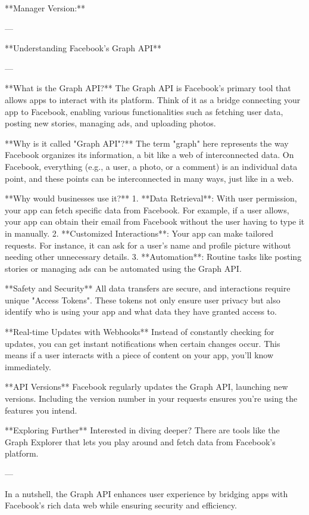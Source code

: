 **Manager Version:**

---

**Understanding Facebook's Graph API**

---

**What is the Graph API?**
The Graph API is Facebook's primary tool that allows apps to interact with its platform. Think of it as a bridge connecting your app to Facebook, enabling various functionalities such as fetching user data, posting new stories, managing ads, and uploading photos.

**Why is it called "Graph API"?**
The term "graph" here represents the way Facebook organizes its information, a bit like a web of interconnected data. On Facebook, everything (e.g., a user, a photo, or a comment) is an individual data point, and these points can be interconnected in many ways, just like in a web.

**Why would businesses use it?**
1. **Data Retrieval**: With user permission, your app can fetch specific data from Facebook. For example, if a user allows, your app can obtain their email from Facebook without the user having to type it in manually.
2. **Customized Interactions**: Your app can make tailored requests. For instance, it can ask for a user's name and profile picture without needing other unnecessary details.
3. **Automation**: Routine tasks like posting stories or managing ads can be automated using the Graph API.

**Safety and Security**
All data transfers are secure, and interactions require unique "Access Tokens". These tokens not only ensure user privacy but also identify who is using your app and what data they have granted access to.

**Real-time Updates with Webhooks**
Instead of constantly checking for updates, you can get instant notifications when certain changes occur. This means if a user interacts with a piece of content on your app, you'll know immediately.

**API Versions**
Facebook regularly updates the Graph API, launching new versions. Including the version number in your requests ensures you're using the features you intend.

**Exploring Further**
Interested in diving deeper? There are tools like the Graph Explorer that lets you play around and fetch data from Facebook's platform.

---

In a nutshell, the Graph API enhances user experience by bridging apps with Facebook's rich data web while ensuring security and efficiency.